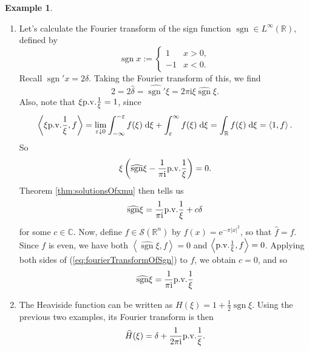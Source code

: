 \documentclass{book}
\newcommand{\scrS}{\mathscr{S}}
\newcommand{\bbC}{\mathbb{C}}
\newcommand{\bbR}{\mathbb{R}}
\renewcommand{\d}{\mathrm{d}}
\newcommand{\e}{\mathrm{e}}
\renewcommand{\i}{\mathrm{i}}
\renewcommand{\epsilon}{\varepsilon}
\newcommand{\abs}[1]{\left\lvert {#1} \right\rvert}
\newcommand{\angles}[1]{\left\langle {#1} \right\rangle}
\newcommand{\parens}[1]{\left( {#1} \right)}
\DeclareMathOperator{\sgn}{sgn}
\theoremstyle{definition}
\newtheorem{example}[theorem]{Example}
\theoremstyle{remark}
\numberwithin{equation}{chapter}
\begin{document}
\begin{example}
\begin{enumerate}[label=(\arabic*)]
        \item Let's calculate the Fourier transform of the sign function $\sgn \in L^\infty(\bbR)$, defined by 
        \begin{equation}
            \sgn{x} :=
            \begin{cases}
                1  & x > 0, \\
                -1 & x < 0.
            \end{cases}
        \end{equation}
        Recall $\sgn'{x} = 2\delta$. Taking the Fourier transform of this, we find 
        \begin{equation}
            2 = 2\widehat{\delta} = \widehat{\sgn'}{\xi} = 2\pi\i\xi\widehat{\sgn}{\xi}.
        \end{equation}
        Also, note that $\xi{\rm p.v.}\frac{1}{\xi} = 1$, since
        \begin{equation}
            \angles{ \xi{\rm p.v.}\frac{1}{\xi}, f } = \lim_{\epsilon \downarrow 0} \int_{-\infty}^{-\epsilon} f(\xi) \; \d \xi + \int_\epsilon^\infty f(\xi) \; \d\xi
            = \int_\bbR f(\xi) \; \d\xi 
            = \angles{1,f}.
        \end{equation}
        So
        \begin{equation}
            \xi\parens{ \widehat{\sgn}{\xi} - \frac{1}{\pi\i}{\rm p.v.}\frac{1}{\xi} } = 0.
        \end{equation}
        Theorem \ref{thm:solutionsOfxmu} then tells us 
        \begin{equation} \label{eq:fourierTransformOfSgn}
            \widehat{\sgn}{\xi} = \frac{1}{\pi\i}{\rm p.v.}\frac{1}{\xi} + c\delta 
        \end{equation}
        for some $c \in \bbC$. Now, define $f \in \scrS(\bbR^n)$ by $f(x) = \e^{-\pi\abs{x}^2}$, so that $\widehat{f} = f$. Since $f$ is even, we have both $\angles{\widehat{\sgn}{\xi},f} = 0$ and $\angles{ {\rm p.v.}\frac{1}{\xi}, f } = 0$. Applying both sides of (\ref{eq:fourierTransformOfSgn}) to $f$, we obtain $c = 0$, and so
        \begin{equation}
            \widehat{\sgn}{\xi} = \frac{1}{\pi\i}{\rm p.v.}\frac{1}{\xi}
        \end{equation}

        \item The Heaviside function can be written as $H(\xi) = 1 + \frac{1}{2}\sgn{\xi}$. Using the previous two examples, its Fourier transform is then 
        \begin{equation}
            \widehat{H}(\xi) = \delta + \frac{1}{2\pi\i}{\rm p.v.}\frac{1}{\xi}.
        \end{equation}
    \end{enumerate}
\end{example}
\end{document}
